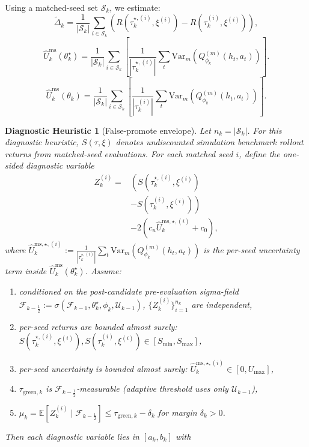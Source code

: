 \documentclass[letterpaper,10pt,conference]{ieeeconf}
\newtheorem{heuristic}{Diagnostic Heuristic}
\begin{document}
Using a matched-seed set $\mathcal{S}_k$, we estimate:
\[
\tilde{\Delta}_k=\frac{1}{|\mathcal{S}_k|}\sum_{i\in\mathcal{S}_k}
\left(R(\tau_{k}^{\star,(i)},\xi^{(i)})-R(\tau_{k}^{(i)},\xi^{(i)})\right),
\]
\[
\widehat{U}^{\mathrm{ms}}_k(\theta_k^\star)=\frac{1}{|\mathcal{S}_k|}\sum_{i\in\mathcal{S}_k}
\left[\frac{1}{|\tau_{k}^{\star,(i)}|}\sum_t \mathrm{Var}_{m}\!\left(Q_{\phi_k}^{(m)}(h_t,a_t)\right)\right].
\]
\[
\widehat{U}^{\mathrm{ms}}_k(\theta_{k})=\frac{1}{|\mathcal{S}_k|}\sum_{i\in\mathcal{S}_k}
\left[\frac{1}{|\tau_{k}^{(i)}|}\sum_t \mathrm{Var}_{m}\!\left(Q_{\phi_k}^{(m)}(h_t,a_t)\right)\right].
\]
\begin{heuristic}[False-promote envelope]
\label{heur:false-promote}
Let $n_k=|\mathcal{S}_k|$.
For this diagnostic heuristic, $S(\tau,\xi)$ denotes undiscounted simulation benchmark rollout returns from matched-seed evaluations.
For each matched seed $i$, define the one-sided diagnostic variable
\[
\begin{aligned}
Z_k^{(i)} ={}& \left(S(\tau_{k}^{\star,(i)},\xi^{(i)})\right.\\
&\left.-S(\tau_{k}^{(i)},\xi^{(i)})\right)\\
&-2\!\left(c_u\widehat{U}^{\mathrm{ms},\star,(i)}_k+c_0\right),
\end{aligned}
\]
where $\widehat{U}^{\mathrm{ms},\star,(i)}_k:=\frac{1}{|\tau_{k}^{\star,(i)}|}\sum_t \mathrm{Var}_{m}\!\left(Q_{\phi_k}^{(m)}(h_t,a_t)\right)$
is the per-seed uncertainty term inside $\widehat{U}^{\mathrm{ms}}_k(\theta_k^\star)$.
Assume:
\begin{enumerate}
\item conditioned on the post-candidate pre-evaluation sigma-field $\mathcal{F}_{k-\frac{1}{2}}:=\sigma(\mathcal{F}_{k-1},\theta_k^\star,\phi_k,\mathcal{U}_{k-1})$, $\{Z_k^{(i)}\}_{i=1}^{n_k}$ are independent,
\item per-seed returns are bounded almost surely: $S(\tau_k^{\star,(i)},\xi^{(i)}),S(\tau_k^{(i)},\xi^{(i)})\in [S_{\min},S_{\max}]$,
\item per-seed uncertainty is bounded almost surely: $\widehat{U}^{\mathrm{ms},\star,(i)}_k\in[0,U_{\max}]$,
\item $\tau_{\text{green},k}$ is $\mathcal{F}_{k-\frac{1}{2}}$-measurable (adaptive threshold uses only $\mathcal{U}_{k-1}$),
\item $\mu_k=\mathbb{E}[Z_k^{(i)}\mid \mathcal{F}_{k-\frac{1}{2}}]\le \tau_{\text{green},k}-\delta_k$ for margin $\delta_k>0$.
\end{enumerate}
Then each diagnostic variable lies in $[a_k,b_k]$ with

\end{heuristic}
\end{document}
